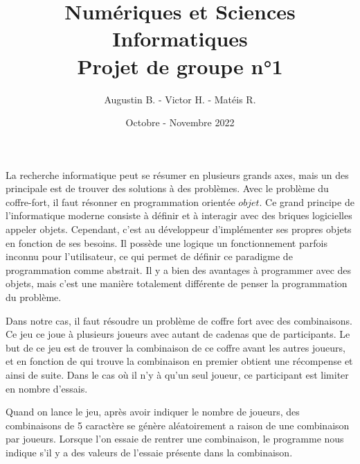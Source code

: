 \documentclass{article}
\title{Numériques et Sciences Informatiques \\ Projet de groupe n°1}
\author{Augustin B. - Victor H. - Matéis R.}
\date{Octobre - Novembre 2022}
\begin{document}
    \maketitle
    
    La recherche informatique peut se résumer en plusieurs grands axes, mais un des principale est de trouver des solutions à des problèmes. Avec le problème du coffre-fort, il faut résonner en programmation orientée $objet$. Ce grand principe de l'informatique moderne consiste à définir et à interagir avec des briques logicielles appeler objets. Cependant, c'est au développeur d'implémenter ses propres objets en fonction de ses besoins. Il possède une logique un fonctionnement parfois inconnu pour l'utilisateur, ce qui permet de définir ce paradigme de programmation comme abstrait. Il y a bien des avantages à programmer avec des objets, mais c'est une manière totalement différente de penser la programmation du problème. \newline
    
    Dans notre cas, il faut résoudre un problème de coffre fort avec des combinaisons. Ce jeu ce joue à plusieurs joueurs avec autant de cadenas que de participants. Le but de ce jeu est de trouver la combinaison de ce coffre avant les autres joueurs, et en fonction de qui trouve la combinaison en premier obtient une récompense et ainsi de suite. Dans le cas où il n'y à qu'un seul joueur, ce participant est limiter en nombre d'essais. \newline
    
    Quand on lance le jeu, après avoir indiquer le nombre de joueurs, des combinaisons de 5 caractère se génère aléatoirement a raison de une combinaison par joueurs. Lorsque l'on essaie de rentrer une combinaison, le programme nous indique s'il y a des valeurs de l'essaie présente dans la combinaison. \newline
\end{document}
